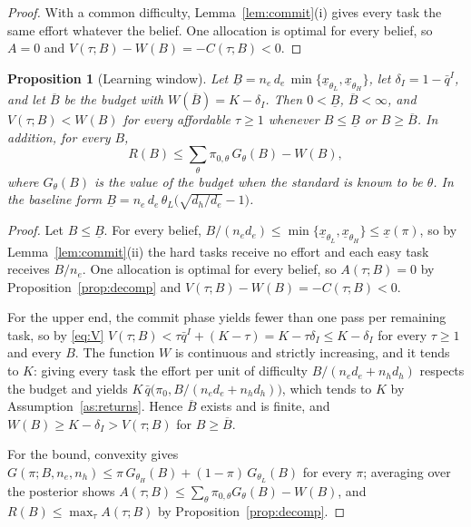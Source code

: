 \documentclass[11pt]{article}
\newtheorem{proposition}{Proposition}
\theoremstyle{definition}
\begin{document}
\begin{proof}
With a common difficulty, Lemma~\ref{lem:commit}(i) gives every task the same effort whatever the belief. One allocation is optimal for every belief, so $A=0$ and $V(\tau;B)-W(B)=-C(\tau;B)<0$.
\end{proof}

\begin{proposition}[Learning window]\label{prop:window}
Let $\underline B=n_e\,d_e\,\min\{\underline x_{\theta_L},\underline x_{\theta_H}\}$, let $\delta_I=1-\bar q^I$, and let $\overline B$ be the budget with $W(\overline B)=K-\delta_I$. Then $0<\underline B$, $\overline B<\infty$, and $V(\tau;B)<W(B)$ for every affordable $\tau\ge1$ whenever $B\le\underline B$ or $B\ge\overline B$. In addition, for every $B$,
\[
R(B)\le\sum_\theta\pi_{0,\theta}\,G_\theta(B)-W(B),
\]
where $G_\theta(B)$ is the value of the budget when the standard is known to be $\theta$. In the baseline form $\underline B=n_e\,d_e\,\theta_L\bigl(\sqrt{d_h/d_e}-1\bigr)$.
\end{proposition}

\begin{proof}
Let $B\le\underline B$. For every belief, $B/(n_e d_e)\le\min\{\underline x_{\theta_L},\underline x_{\theta_H}\}\le\underline x(\pi)$, so by Lemma~\ref{lem:commit}(ii) the hard tasks receive no effort and each easy task receives $B/n_e$. One allocation is optimal for every belief, so $A(\tau;B)=0$ by Proposition~\ref{prop:decomp} and $V(\tau;B)-W(B)=-C(\tau;B)<0$.

For the upper end, the commit phase yields fewer than one pass per remaining task, so by \eqref{eq:V} $V(\tau;B)<\tau\bar q^I+(K-\tau)=K-\tau\delta_I\le K-\delta_I$ for every $\tau\ge1$ and every $B$. The function $W$ is continuous and strictly increasing, and it tends to $K$: giving every task the effort per unit of difficulty $B/(n_ed_e+n_hd_h)$ respects the budget and yields $K\,\bar q\bigl(\pi_0,B/(n_ed_e+n_hd_h)\bigr)$, which tends to $K$ by Assumption~\ref{as:returns}. Hence $\overline B$ exists and is finite, and $W(B)\ge K-\delta_I>V(\tau;B)$ for $B\ge\overline B$.

For the bound, convexity gives $G(\pi;B,n_e,n_h)\le\pi\,G_{\theta_H}(B)+(1-\pi)\,G_{\theta_L}(B)$ for every $\pi$; averaging over the posterior shows $A(\tau;B)\le\sum_\theta\pi_{0,\theta}G_\theta(B)-W(B)$, and $R(B)\le\max_\tau A(\tau;B)$ by Proposition~\ref{prop:decomp}.
\end{proof}
\end{document}

